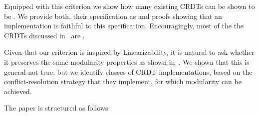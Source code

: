 Equipped with this criterion we show how many existing CRDTs can be
shown to be \CRDTLinshort{}.
%
We provide both, their specification as \CRDTLinshort{} and proofs
showing that an implementation is faithful to this specification.
%
Encouragingly, most of the the CRDTs discussed in~\cite{ShapiroPBZ11}
are \CRDTLinshort{}.

Given that our criterion is inspired by Linearizability, it is natural
to ask whether it preserves the same modularity properties as shown
in~\cite{HerlihyW90}.
%
We shown that this is general not true, but we identify classes of
CRDT implementations, based on the conflict-resolution strategy that
they implement, for which modularity can be achieved.


The paper is structured as follows:
\begin{inparaitem}
\item {}
\end{inparaitem}






